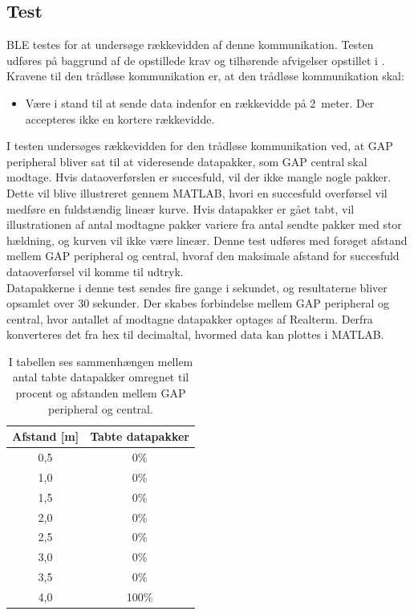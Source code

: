 \subsection{Test}
BLE testes for at undersøge rækkevidden af denne kommunikation. Testen udføres på baggrund af de opstillede krav og tilhørende afvigelser opstillet i . Kravene til den trådløse kommunikation er, at den trådløse kommunikation skal:
\begin{itemize}
	\item Være i stand til at sende data indenfor en rækkevidde på 2~meter. Der accepteres ikke en kortere rækkevidde.
\end{itemize}
I testen undersøges rækkevidden for den trådløse kommunikation ved, at GAP peripheral bliver sat til at videresende datapakker, som GAP central skal modtage. Hvis dataoverførslen er succesfuld, vil der ikke mangle nogle pakker. Dette vil blive illustreret gennem MATLAB, hvori en succesfuld overførsel vil medføre en fuldstændig lineær kurve. Hvis datapakker er gået tabt, vil illustrationen af antal modtagne pakker variere fra antal sendte pakker med stor hældning, og kurven vil ikke være lineær. Denne test udføres med forøget afstand mellem GAP peripheral og central, hvoraf den maksimale afstand for succesfuld dataoverførsel vil komme til udtryk. \\
Datapakkerne i denne test sendes fire gange i sekundet, og resultaterne bliver opsamlet over 30 sekunder. Der skabes forbindelse mellem GAP peripheral og central, hvor antallet af modtagne datapakker optages af Realterm. Derfra konverteres det fra hex til decimaltal, hvormed data kan plottes i MATLAB.
\begin{table}[H]
	\centering
	\begin{tabular}{cc}
			\hline
		\rowcolor[HTML]{C0C0C0} 
		Afstand {[}m{]} & Tabte datapakker \\ 	\hline
		0,5 	& 0\% \\ 	\hline
		1,0		& 0\% \\	\hline
		1,5 	& 0\% \\	\hline
		2,0		& 0\% \\	\hline
		2,5 	& 0\% \\	\hline
		3,0		& 0\% \\	\hline
		3,5 	& 0\% \\	\hline
		4,0		& 100\% \\	\hline
	\end{tabular}
	\caption{I tabellen ses sammenhængen mellem antal tabte datapakker omregnet til procent og afstanden mellem GAP peripheral og central.}
	\label{test:ble_overforsel}
\end{table}\vspace{-.25cm}

